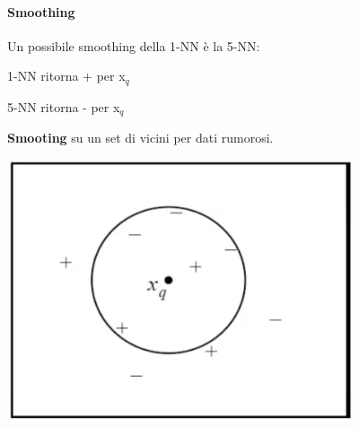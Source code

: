 \documentclass[10pt]{book}
\begin{document}
\paragraph{Smoothing} Un possibile smoothing della 1-NN è la 5-NN:
\begin{multicols}{2}
\begin{list}{}{}
	\item 1-NN ritorna + per x$_q$
	\item 5-NN ritorna - per x$_q$
\end{list}
\textbf{Smooting} su un set di vicini per dati rumorosi.
\begin{center}
	\includegraphics[scale=0.5]{ml5nn.png}
\end{center}
\end{multicols}
\end{document}
